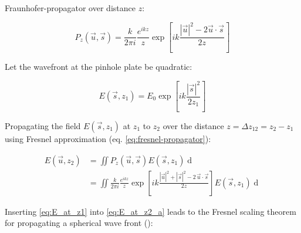 \documentclass{osa-article}
\begin{document}
Fraunhofer-propagator over distance $z$:

\begin{equation}
    P_z(\vec{u},\vec{s}) = \frac{k}{2 \pi i} \frac{e^{ikz}}{z} \exp{\left[ik \frac{\left|\vec{u}\right|^2 - 2 \vec{u}\cdot\vec{s}}{2z}\right]}
\end{equation}

Let the wavefront at the pinhole plate be quadratic:

\begin{equation}
    E(\vec{s},z_1) = E_0 \exp{\left[ ik \frac{|\vec{s}|^2}{2z_1} \right]}
    \label{eq:E_at_z1}
\end{equation}

Propagating the field $E(\vec{s},z_1)$ at $z_1$ to $z_2$ over the distance $z = \Delta z_{12} = z_2-z_1$ using Fresnel approximation (eq. \ref{eq:fresnel-propagator}):

\begin{align}
    E(\vec{u},z_2) &= \iint P_z(\vec{u},\vec{s}) E(\vec{s},z_1)  \mathop{d\vec{s}} \\
    &= \iint  \frac{k}{2 \pi i} \frac{e^{ikz}}{z} \exp \left[ ik \frac{|\vec{u}|^2 + |\vec{s}|^2 - 2 \, \vec{u} \cdot \vec{s} }{2z} \right] E(\vec{s},z_1) \mathop{d\vec{s}} \label{eq:E_at_z2_a}
\end{align}

Inserting \ref{eq:E_at_z1} into \ref{eq:E_at_z2_a} leads to the Fresnel scaling theorem for propagating a spherical wave front (\cite["Appendix B", pp.397-400]{Paganin2006}):

\end{document}
